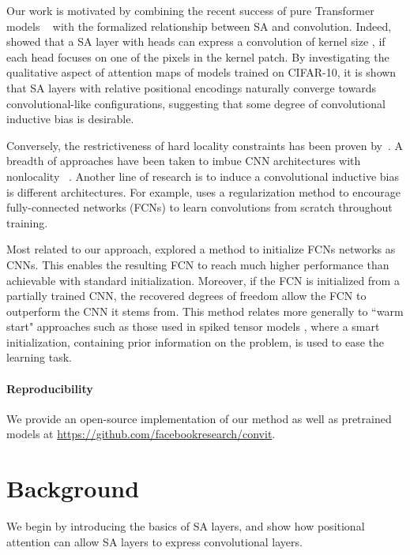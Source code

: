 \documentclass[a4paper,11pt,twocolumn]{article}
\newcommand{\citet}[1]{\textcite{#1}}
\begin{document}
Our work is motivated by combining the recent success of pure Transformer models ~\cite{dosovitskiy2020image} with the formalized relationship between SA and convolution. Indeed, \citet{cordonnier2019relationship} showed that a SA layer with  heads can express a convolution of kernel size , if each head focuses on one of the pixels in the kernel patch. By investigating the qualitative aspect of attention maps of models trained on CIFAR-10, it is shown that SA layers with relative positional encodings naturally converge towards convolutional-like configurations, suggesting that some degree of convolutional inductive bias is desirable.

Conversely, the restrictiveness of hard locality constraints has been proven by~\citet{elsayed2020revisiting}. A breadth of approaches have been taken to imbue CNN architectures with nonlocality ~\cite{hu_gather-excite_2018,hu_squeeze-and-excitation_2018,wang_non-local_2018,wu_visual_2020}. Another line of research is to induce a convolutional inductive bias is different architectures. For example, \citet{neyshabur2020towards} uses a regularization method to encourage fully-connected networks (FCNs) to learn convolutions from scratch throughout training. 

Most related to our approach, \citet{d2019finding} explored a method to initialize FCNs networks as CNNs. This enables the resulting FCN to reach much higher performance than achievable with standard initialization. Moreover, if the FCN is initialized from a partially trained CNN, the recovered degrees of freedom allow the FCN to outperform the CNN it stems from. This method relates more generally to ``warm start" approaches such as those used in spiked tensor models \cite{anandkumar2016homotopy}, where a smart initialization, containing prior information on the problem, is used to ease the learning task.

\paragraph{Reproducibility}
We provide an open-source implementation of our method as well as pretrained models at \url{https://github.com/facebookresearch/convit}.

\section{Background}

We begin by introducing the basics of SA layers, and show how positional attention can allow SA layers to express convolutional layers.
\end{document}
